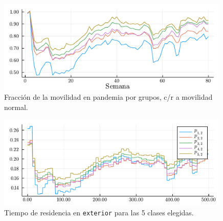 \begin{figure}[!h]
\centering
\includegraphics[width=0.99\textwidth]{img/resultados/mob-reduction.pdf}
\caption{Fracción de la movilidad en pandemia por grupos, c/r a movilidad normal.}
\label{img:mov-pandemia}
\end{figure}

\begin{figure}[!h]
\centering
\includegraphics[width=0.99\textwidth]{img/resultados/tiempos-exterior.pdf}
\caption[Tiempo de residencia en \texttt{exterior} para las 5 clases elegidas.]{Tiempo de residencia en \texttt{exterior} para las 5 clases elegidas.}
\label{img:Pmatrix-pandemia-exterior}
\end{figure}